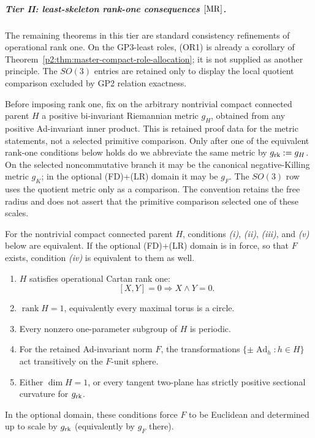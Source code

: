 \documentclass[11pt,a4paper]{article}
\begin{document}
\subparagraph{Tier II: least-skeleton rank-one consequences
\([{\rm MR}]\).}

The remaining theorems in this tier are standard consistency refinements of
operational rank one.  On the GP3-least roles, (OR1) is already a corollary
of Theorem~\ref{p2:thm:master-compact-role-allocation}; it is not supplied as
another principle.  The \(SO(3)\) entries are retained only to display the
local quotient comparison excluded by GP2 relation exactness.

Before imposing rank one, fix on the arbitrary nontrivial compact connected
parent \(H\) a positive bi-invariant Riemannian metric \(g_H\), obtained from
any positive Ad-invariant inner product.  This is retained proof data for the
metric statements, not a selected primitive comparison.  Only after one of
the equivalent rank-one conditions below holds do we abbreviate the same
metric by \(g_{\rm rk}:=g_H\).  On the selected noncommutative branch it may be
the canonical negative-Killing metric \(g_K\); in the optional (FD)+(LR)
domain it may be \(g_F\).  The \(SO(3)\) row uses the quotient metric only as a
comparison.  The convention retains the free radius and does not assert that
the primitive comparison selected one of these scales.

\begin{theorem}
\label{p2:thm:rank-one-equivalence-package}
For the nontrivial compact connected parent \(H\), conditions
\emph{(i)}, \emph{(ii)}, \emph{(iii)}, and \emph{(v)} below are equivalent.
If the optional (FD)+(LR) domain is in force, so that \(F\) exists, condition
\emph{(iv)} is equivalent to them as well.
\begin{enumerate}[label=(\roman*), leftmargin=2em]
\item \(H\) satisfies operational Cartan rank one:
\[
 [X,Y]=0\Longrightarrow X\wedge Y=0.
\]
\item \(\operatorname{rank}H=1\), equivalently every maximal torus is a
circle.
\item Every nonzero one-parameter subgroup of \(H\) is periodic.
\item For the retained Ad-invariant norm \(F\), the transformations
\(\{\pm\operatorname{Ad}_h:h\in H\}\) act transitively on the \(F\)-unit
sphere.
\item Either \(\dim H=1\), or every tangent two-plane has strictly positive
sectional curvature for \(g_{\rm rk}\).
\end{enumerate}
In the optional domain, these conditions force \(F\) to be Euclidean and
determined up to scale by \(g_{\rm rk}\) (equivalently by \(g_F\) there).
\end{theorem}
\end{document}

